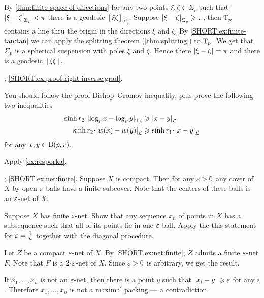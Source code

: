 By \ref{thm:finite-space-of-directions} for any two points $\xi,\zeta\in\Sigma_p$ such that $\dist{\xi}{\zeta}{\Sigma_p}<\pi$ there is a geodesic $[\xi\zeta]_{\Sigma_p}$.
Suppose $\dist{\xi}{\zeta}{\Sigma_p}\ge\pi$, then $\mathrm{T}_p$ contains a line thru the origin in the directions $\xi$ and $\zeta$.
By \ref{SHORT.ex:finite-tan:tan} we can apply the splitting theorem (\ref{thm:splitting}) to $\mathrm{T}_p$.
We get that $\Sigma_p$ is a spherical suspension with poles $\xi$ and $\zeta$.
Hence there $\dist\xi\zeta{}=\pi$ and there is a geodesic $[\xi\zeta]$.


\parbf{\ref{ex:proof-right-inverse}}; \ref{SHORT.ex:proof-right-inverse:grad}.

\parit{\ref{SHORT.ex:proof-right-inverse:alpha}}

\parit{\ref{SHORT.ex:proof-right-inverse:end}}


You should follow the proof Bishop--Gromov inequality, plus prove the following two inequalities 
\begin{align*}
\sinh r_2\cdot \dist{\log_p x}{\log_p y}{\T_p} &\ge\dist{x}{y}{\spc{L}}
\\
\sinh r_2\cdot\dist{w(x)}{w(y)}{\spc{L}} &\ge \sinh r_1\cdot\dist{x}{y}{\spc{L}}
\end{align*}
for any $x,y\in\mathrm{B}{}(p,r)$.


 Apply \ref{ex:resporka}.

\parbf{\ref{ex:net}};
\ref{SHORT.ex:net:finite}.
Suppose $X$ is compact.
Then for any $\varepsilon>0$ any cover of $X$ by open $\varepsilon$-balls have a finite subcover.
Note that the centers of these balls is an $\varepsilon$-net of $X$.

Suppose $X$ has finite $\varepsilon$-net.
Show that any sequence $x_n$ of points in $X$ has a subsequence such that all of its points lie in one $\varepsilon$-ball.
Apply the this statement for $\varepsilon=\tfrac1n$ together with the diagonal procedure.

Let $Z$ be a compact $\varepsilon$-net of $X$.
By \ref{SHORT.ex:net:finite}, $Z$ admits a finite $\varepsilon$-net $F$.
Note that $F$ is a $2\cdot\eps$-net of $X$.
Since $\varepsilon>0$ is arbitrary, we get the result.


 If $x_1,\dots,x_n$ is not an $\varepsilon$-net, then there is a point $y$ such that $\dist{x_i}{y}{}\ge\eps$ for any $i$.
Therefore $x_1,\dots,x_n$ is not a maximal packing --- a contradiction.

